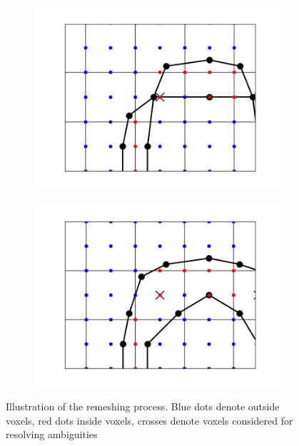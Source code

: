 \begin{figure}
\begin{center}
\begin{subfigure}[b]{.5\linewidth}
\centering
\includegraphics[width = \textwidth]{Pictures/SurfaceReconstruction/2DDoubleTorusNonManifoldDetail}
\end{subfigure}%
\begin{subfigure}[b]{.5\linewidth}
\centering
\includegraphics[width = \textwidth]{Pictures/SurfaceReconstruction/2DDoubleTorusManifoldDetail}
\end{subfigure}
\end{center}
\caption{Illustration of the remeshing process. Blue dots denote outside voxels, red dots inside voxels, crosses denote voxels considered for resolving ambiguities}
\label{fig:manifoldResolution2D}
\end{figure}


